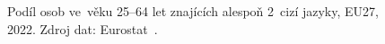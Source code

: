 \def\strProblemyJazykyVekTitle{Znalost ${\ge}$\,2 cizích jazyků, věková skupina 25--64 let (2022)}%
\def\strProblemyJazykyVekColorbarLabel{\% věkové skupiny 25--64}%
\def\strProblemyJazykyVekCaption{\centering Podíl osob ve~věku 25--64 let znajících alespoň 2~cizí jazyky, EU27, 2022. Zdroj dat: Eurostat~\cite{eurostat_edat_aes}.}%
%
\begin{figure}[htbp]
  \centering
  \resizebox{0.85\linewidth}{!}{}
  \caption{\strProblemyJazykyVekCaption}
  \label{fig:problemy_jazyky_vek}
\end{figure}
